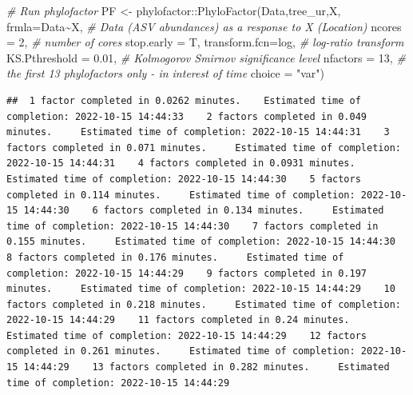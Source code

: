 \documentclass[
]{book}
\newenvironment{Shaded}{\begin{snugshade}}{\end{snugshade}}
\newcommand{\AttributeTok}[1]{\textcolor[rgb]{0.77,0.63,0.00}{#1}}
\newcommand{\CommentTok}[1]{\textcolor[rgb]{0.56,0.35,0.01}{\textit{#1}}}
\newcommand{\DecValTok}[1]{\textcolor[rgb]{0.00,0.00,0.81}{#1}}
\newcommand{\FloatTok}[1]{\textcolor[rgb]{0.00,0.00,0.81}{#1}}
\newcommand{\FunctionTok}[1]{\textcolor[rgb]{0.00,0.00,0.00}{#1}}
\newcommand{\NormalTok}[1]{#1}
\newcommand{\OtherTok}[1]{\textcolor[rgb]{0.56,0.35,0.01}{#1}}
\newcommand{\SpecialCharTok}[1]{\textcolor[rgb]{0.00,0.00,0.00}{#1}}
\newcommand{\StringTok}[1]{\textcolor[rgb]{0.31,0.60,0.02}{#1}}
\begin{document}
\begin{Shaded}
\begin{Highlighting}[]
\CommentTok{\# Run phylofactor}
\NormalTok{PF }\OtherTok{\textless{}{-}}\NormalTok{  phylofactor}\SpecialCharTok{::}\FunctionTok{PhyloFactor}\NormalTok{(Data,tree\_ur,X, }
        \AttributeTok{frmla=}\NormalTok{Data}\SpecialCharTok{\textasciitilde{}}\NormalTok{X,    }\CommentTok{\# Data (ASV abundances) as a response to X (Location)}
        \AttributeTok{ncores =} \DecValTok{2}\NormalTok{,      }\CommentTok{\# number of cores }
        \AttributeTok{stop.early =}\NormalTok{ T, }
        \AttributeTok{transform.fcn=}\NormalTok{log,    }\CommentTok{\# log{-}ratio transform}
        \AttributeTok{KS.Pthreshold =} \FloatTok{0.01}\NormalTok{, }\CommentTok{\# Kolmogorov Smirnov significance level }
        \AttributeTok{nfactors =} \DecValTok{13}\NormalTok{, }\CommentTok{\# the first 13 phylofactors only {-} in interest of time }
        \AttributeTok{choice =} \StringTok{"var"}\NormalTok{)}
\end{Highlighting}
\end{Shaded}

\begin{verbatim}
##  1 factor completed in 0.0262 minutes.    Estimated time of completion: 2022-10-15 14:44:33    2 factors completed in 0.049 minutes.     Estimated time of completion: 2022-10-15 14:44:31    3 factors completed in 0.071 minutes.     Estimated time of completion: 2022-10-15 14:44:31    4 factors completed in 0.0931 minutes.     Estimated time of completion: 2022-10-15 14:44:30    5 factors completed in 0.114 minutes.     Estimated time of completion: 2022-10-15 14:44:30    6 factors completed in 0.134 minutes.     Estimated time of completion: 2022-10-15 14:44:30    7 factors completed in 0.155 minutes.     Estimated time of completion: 2022-10-15 14:44:30    8 factors completed in 0.176 minutes.     Estimated time of completion: 2022-10-15 14:44:29    9 factors completed in 0.197 minutes.     Estimated time of completion: 2022-10-15 14:44:29    10 factors completed in 0.218 minutes.     Estimated time of completion: 2022-10-15 14:44:29    11 factors completed in 0.24 minutes.     Estimated time of completion: 2022-10-15 14:44:29    12 factors completed in 0.261 minutes.     Estimated time of completion: 2022-10-15 14:44:29    13 factors completed in 0.282 minutes.     Estimated time of completion: 2022-10-15 14:44:29   
\end{verbatim}
\end{document}
